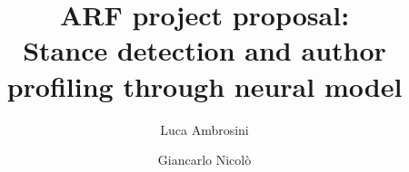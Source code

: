 


\author{Luca Ambrosini \and Giancarlo Nicol\`{o}}
\title{ARF project proposal: \\ Stance detection and author profiling through neural model}
\date{}



\maketitle

\tableofcontents

 








